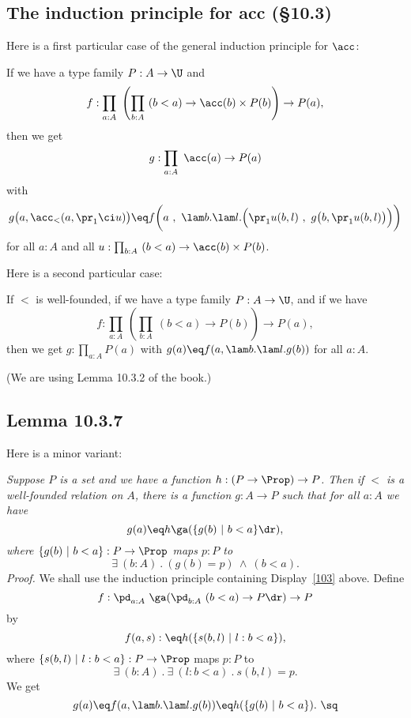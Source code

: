 \documentclass[12pt]{article}
\begin{document}
\subsection{The induction principle for \textsf{acc} (\S10.3)}

Here is a first particular case of the general induction principle for $\acc$:

If we have a type family $P:A\to\U$ and %
$$
f:\prod_{a:A}\ \left(\prod_{b:A}\ (b<a)\to\acc(b)\times P(b)\right)\to P(a),%
$$ 
then we get 
$$
g:\prod_{a:A}\ \acc(a)\to P(a)
$$
with
$$
g\big(a,\acc_<(a,\pr_1\ci u)\big)\eq f\bigg(a\ ,\ \lam b.\lam l.\Big(\pr_1 u(b,l)\ ,\ g\big(b,\pr_1 u(b,l)\big)\Big)\bigg)
$$
for all $a:A$ and all $u:\prod_{b:A}\ (b<a)\to\acc(b)\times P(b)$. 

Here is a second particular case:

If $<$ is well-founded, if we have a type family $P:A\to\U$, and if we have 
\begin{equation}\label{103}
f:\prod_{a:A}\ \left(\prod_{b:A}\ (b<a)\to P(b)\right)\to P(a),
\end{equation} 
then we get $g:\prod_{a:A}P(a)$ with $g(a)\eq f(a,\lam b.\lam l.g(b))$ for all $a:A$.

(We are using Lemma 10.3.2 of the book.)


\subsection{Lemma 10.3.7}%

Here is a minor variant:

\nn\emph{Suppose $P$ is a set and we have a function $h:(P\to\Prop)\to P$. Then if $<$ is a well-founded relation on $A$, there is a function $g:A\to P$ such that for all $a:A$ we have} 
$$
g(a)\eq h\ga(\{g(b)\ \vert\ b<a\}\dr),
$$ 
\emph{where $\{g(b)\ \vert\ b<a\}:P\to\Prop$ maps $p:P$ to} 
$$
\exists\ (b:A)\ .\ (g(b)=p)\ \wedge\ (b<a).
$$ 
\emph{Proof.} We shall use the induction principle containing Display~\eqref{103} above. Define 
$$
f:\pd_{a:A}\ \ga(\pd_{b:A}\ (b<a)\to P\dr)\to P
$$ 
by 
$$
f(a,s):\eq h(\{s(b,l)\ \vert\ l:b<a\}),
$$ 
where $\{s(b,l)\ \vert\ l:b<a\}:P\to\Prop$ maps $p:P$ to 
$$
\exists\ (b:A)\ .\ \exists\ (l:b<a)\ .\ s(b,l)=p.
$$ 
We get 
$$
g(a)\eq f(a,\lam b.\lam l.g(b))\eq h(\{g(b)\ \vert\ b<a\}).\ \sq
$$ 
\end{document}
